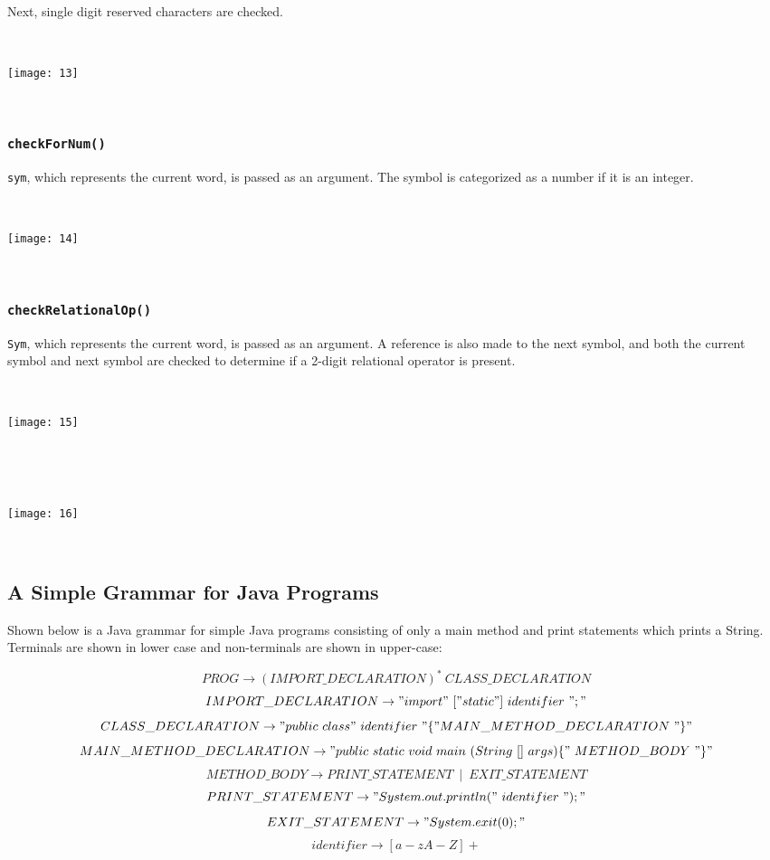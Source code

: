 \documentclass[11pt]{article}
\begin{document}
Next, single digit reserved characters are checked.

~
\begin{center}
\texttt{[image: 13]}
\end{center}
~

\subsubsection{{\tt checkForNum()}}

{\tt sym}, which represents the current word, is passed as an argument. The symbol is categorized as a number if it is an integer.

~
\begin{center}
\texttt{[image: 14]}
\end{center}
~

\subsubsection{{\tt checkRelationalOp()}}

{\tt Sym}, which represents the current word, is passed as an argument. A reference is also made to the next symbol, and both the current symbol and next symbol are checked to determine if a 2-digit relational operator is present.

~
\begin{center}
\texttt{[image: 15]}
\end{center}
~

~
\begin{center}
\texttt{[image: 16]}
\end{center}
~

\subsection{A Simple Grammar for Java Programs}

Shown below is a Java grammar for simple Java programs consisting of only a main method and print statements which prints a String. Terminals are shown in lower case and non-terminals are shown in upper-case:

$$ PROG \rightarrow (IMPORT\_DECLARATION)^{*} ~ CLASS\_DECLARATION$$
$$ IMPORT\_DECLARATION \rightarrow "import" ~["static"] ~identifier ~";" $$
$$ CLASS\_DECLARATION \rightarrow "public~class" ~ identifier~"\{" MAIN\_METHOD\_DECLARATION~"\}" $$
$$ MAIN\_METHOD\_DECLARATION \rightarrow "public~static~void~main~(String~[]~args) \{"~METHOD\_BODY~"\}" $$
$$ METHOD\_BODY \rightarrow PRINT\_STATEMENT ~ \mid ~ EXIT\_STATEMENT$$
$$ PRINT\_STATEMENT \rightarrow "System.out.println(" ~identifier~");" $$
$$ EXIT\_STATEMENT \rightarrow "System.exit(0);" $$
$$ identifier \rightarrow [a-zA-Z]+ $$
\end{document}
